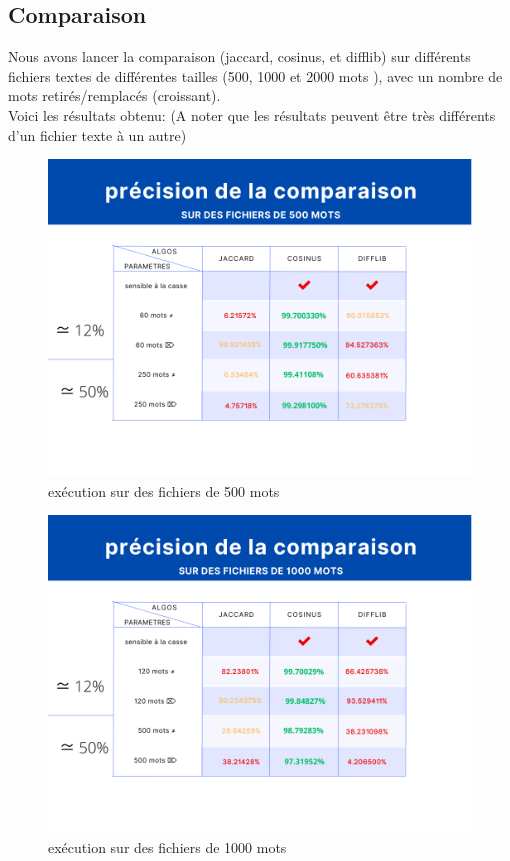 \documentclass[french,12pt]{article}
\begin{document}
\subsection{Comparaison}
Nous avons lancer la comparaison (jaccard, cosinus, et difflib) sur différents fichiers textes de différentes tailles (500, 1000 et 2000 mots ), avec un nombre de mots retirés/remplacés (croissant).\\
Voici les résultats obtenu:
(A noter que les résultats peuvent être très différents d'un fichier texte à un autre)\\

\begin{center}
\begin{figure}[h][t!]
\includegraphics[scale=0.4]{img/jaccard_500_split.png}
\caption{exécution sur des fichiers de 500 mots}
\end{figure}


\end{center}
\begin{center}
\begin{figure}[h]
\includegraphics[scale=0.4]{img/true_jaccard_split_1000.png}
\caption{exécution sur des fichiers de 1000 mots}
\end{figure}


\end{center}
\end{document}
